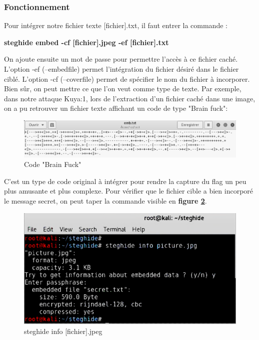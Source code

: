 \subsubsection{Fonctionnement}

Pour intégrer notre fichier texte [fichier].txt, il faut entrer la commande :

\begin{center}
    \textbf{steghide embed -cf [fichier].jpeg -ef [fichier].txt}
\end{center}

On ajoute ensuite un mot de passe pour permettre l’accès à ce fichier caché. L’option -ef (--embedfile) permet l’intégration du fichier désiré dans le fichier ciblé. L’option -cf (--coverfile) permet de spécifier le nom du fichier à incorporer.\\ 
Bien sûr, on peut mettre ce que l'on veut comme type de texte. Par exemple, dans notre attaque Kuya:1, lors de l'extraction d'un fichier caché dans une image, on a pu retrouver un fichier texte affichant un code de type "Brain fuck":\\


\begin{figure}[htp!]
  \centering
  \setlength\figureheight{7cm}
  \setlength\figurewidth{9cm}
  \includegraphics[width=1\textwidth]{oui/Ancien/imangeancien/steghide/STG3.png}
  \caption{Code "Brain Fuck"}
  \label{fig:courbe-tikz}
\end{figure}

C'est un type de code original à intégrer pour rendre la capture du flag un peu plus amusante et plus complexe. Pour vérifier que le fichier cible a bien incorporé le message secret, on peut taper la commande visible en \textbf{figure \ref{fig:steghideinfo}}.

\begin{figure}[htp!]
  \centering
  \setlength\figureheight{7cm}
  \setlength\figurewidth{9cm}
  \includegraphics[width=1\textwidth]{oui/Ancien/imangeancien/steghide/STG2.png}
  \caption{steghide info [fichier].jpeg}
  \label{fig:steghideinfo}
\end{figure}

